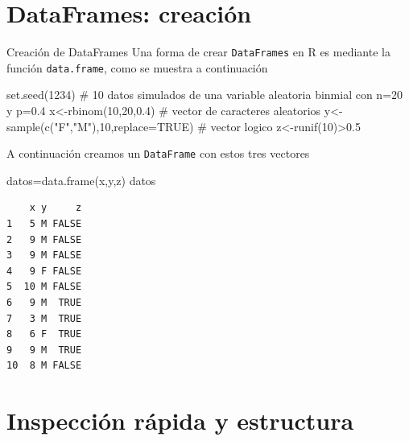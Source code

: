 \documentclass[
  ignorenonframetext,
  aspectratio=169,
  spanish,
]{beamer}
\newenvironment{Shaded}{\begin{snugshade}}{\end{snugshade}}
\newcommand{\AttributeTok}[1]{\textcolor[rgb]{0.40,0.45,0.13}{#1}}
\newcommand{\CommentTok}[1]{\textcolor[rgb]{0.37,0.37,0.37}{#1}}
\newcommand{\ConstantTok}[1]{\textcolor[rgb]{0.56,0.35,0.01}{#1}}
\newcommand{\DecValTok}[1]{\textcolor[rgb]{0.68,0.00,0.00}{#1}}
\newcommand{\FloatTok}[1]{\textcolor[rgb]{0.68,0.00,0.00}{#1}}
\newcommand{\FunctionTok}[1]{\textcolor[rgb]{0.28,0.35,0.67}{#1}}
\newcommand{\NormalTok}[1]{\textcolor[rgb]{0.00,0.23,0.31}{#1}}
\newcommand{\OtherTok}[1]{\textcolor[rgb]{0.00,0.23,0.31}{#1}}
\newcommand{\SpecialCharTok}[1]{\textcolor[rgb]{0.37,0.37,0.37}{#1}}
\newcommand{\StringTok}[1]{\textcolor[rgb]{0.13,0.47,0.30}{#1}}
\begin{document}
\section{DataFrames: creación}\label{dataframes-creaciuxf3n}

\begin{frame}[fragile]{Creación de DataFrames}
\label{creaciuxf3n-de-dataframes}
Una forma de crear \texttt{DataFrames} en R es mediante la función
\texttt{data.frame}, como se muestra a continuación

\begin{Shaded}
\begin{Highlighting}[]
\FunctionTok{set.seed}\NormalTok{(}\DecValTok{1234}\NormalTok{)}
\CommentTok{\# 10 datos simulados de una variable aleatoria binmial con n=20 y p=0.4}
\NormalTok{x}\OtherTok{\textless{}{-}}\FunctionTok{rbinom}\NormalTok{(}\DecValTok{10}\NormalTok{,}\DecValTok{20}\NormalTok{,}\FloatTok{0.4}\NormalTok{)  }
\CommentTok{\# vector de caracteres aleatorios  }
\NormalTok{y}\OtherTok{\textless{}{-}}\FunctionTok{sample}\NormalTok{(}\FunctionTok{c}\NormalTok{(}\StringTok{"F"}\NormalTok{,}\StringTok{"M"}\NormalTok{),}\DecValTok{10}\NormalTok{,}\AttributeTok{replace=}\ConstantTok{TRUE}\NormalTok{)}
\CommentTok{\# vector logico }
\NormalTok{z}\OtherTok{\textless{}{-}}\FunctionTok{runif}\NormalTok{(}\DecValTok{10}\NormalTok{)}\SpecialCharTok{\textgreater{}}\FloatTok{0.5}
\end{Highlighting}
\end{Shaded}
\end{frame}

\begin{frame}[fragile]{}
\label{section}
A continuación creamos un \texttt{DataFrame} con estos tres vectores

\begin{Shaded}
\begin{Highlighting}[]
\NormalTok{datos}\OtherTok{=}\FunctionTok{data.frame}\NormalTok{(x,y,z)}
\NormalTok{datos}
\end{Highlighting}
\end{Shaded}

\begin{verbatim}
    x y     z
1   5 M FALSE
2   9 M FALSE
3   9 M FALSE
4   9 F FALSE
5  10 M FALSE
6   9 M  TRUE
7   3 M  TRUE
8   6 F  TRUE
9   9 M  TRUE
10  8 M FALSE
\end{verbatim}
\end{frame}

\section{Inspección rápida y
estructura}\label{inspecciuxf3n-ruxe1pida-y-estructura}
\end{document}

